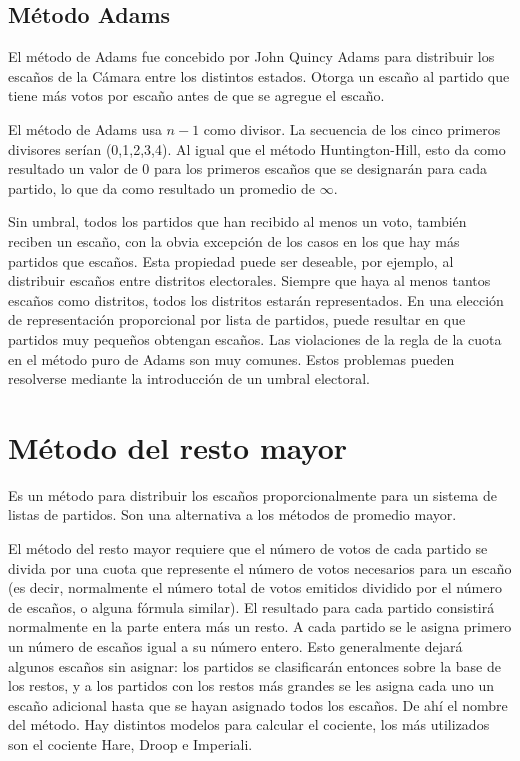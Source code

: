 \documentclass[12pt,a4paper,]{book}
\numberwithin{dummy}{section}
\theoremstyle{ocrenumbox}
\theoremstyle{blacknumex}
\theoremstyle{blacknumbox}
\theoremstyle{ocrenum}
\theoremstyle{ocrenum}
\begin{document}
\hypertarget{muxe9todo-adams}{%
\subsection{Método Adams}\label{muxe9todo-adams}}

El método de Adams fue concebido por John Quincy Adams para distribuir
los escaños de la Cámara entre los distintos estados. Otorga un escaño
al partido que tiene más votos por escaño antes de que se agregue el
escaño.

El método de Adams usa \(n-1\) como divisor. La secuencia de los cinco
primeros divisores serían (0,1,2,3,4). Al igual que el método
Huntington-Hill, esto da como resultado un valor de 0 para los primeros
escaños que se designarán para cada partido, lo que da como resultado un
promedio de \(\infty\).

Sin umbral, todos los partidos que han recibido al menos un voto,
también reciben un escaño, con la obvia excepción de los casos en los
que hay más partidos que escaños. Esta propiedad puede ser deseable, por
ejemplo, al distribuir escaños entre distritos electorales. Siempre que
haya al menos tantos escaños como distritos, todos los distritos estarán
representados. En una elección de representación proporcional por lista
de partidos, puede resultar en que partidos muy pequeños obtengan
escaños. Las violaciones de la regla de la cuota en el método puro de
Adams son muy comunes. Estos problemas pueden resolverse mediante la
introducción de un umbral electoral.

\hypertarget{muxe9todo-del-resto-mayor}{%
\section{Método del resto mayor}\label{muxe9todo-del-resto-mayor}}

Es un método para distribuir los escaños proporcionalmente para un
sistema de listas de partidos. Son una alternativa a los métodos de
promedio mayor.

El método del resto mayor requiere que el número de votos de cada
partido se divida por una cuota que represente el número de votos
necesarios para un escaño (es decir, normalmente el número total de
votos emitidos dividido por el número de escaños, o alguna fórmula
similar). El resultado para cada partido consistirá normalmente en la
parte entera más un resto. A cada partido se le asigna primero un número
de escaños igual a su número entero. Esto generalmente dejará algunos
escaños sin asignar: los partidos se clasificarán entonces sobre la base
de los restos, y a los partidos con los restos más grandes se les asigna
cada uno un escaño adicional hasta que se hayan asignado todos los
escaños. De ahí el nombre del método. Hay distintos modelos para
calcular el cociente, los más utilizados son el cociente Hare, Droop e
Imperiali.
\end{document}
